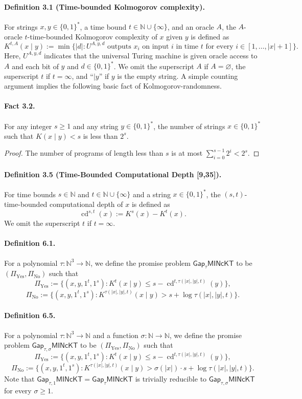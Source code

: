 \documentclass[10pt,a4paper]{article}
\begin{document}
\paragraph{Definition 3.1 (Time-bounded Kolmogorov complexity).}
For strings $x,y\in\{0,1\}^*$, a time bound $t\in\mathbb N\cup\{\infty\}$, and an oracle $A$, the $A$-oracle $t$-time-bounded Kolmogorov complexity of $x$ given $y$ is defined as
\[K^{t,A}(x\mid y):=\min\{|d|:U^{A,y,d}\text{ outputs }x_i\text{ on input }i\text{ in time }t\text{ for every }i\in[1,\ldots,|x|+1]\}.\]
Here, $U^{A,y,d}$ indicates that the universal Turing machine is given oracle access to $A$ and each bit of $y$ and $d\in\{0,1\}^*$. We omit the superscript $A$ if $A=\varnothing$, the superscript $t$ if $t=\infty$, and ``$\mid y$'' if $y$ is the empty string.
A simple counting argument implies the following basic fact of Kolmogorov-randomness.
\paragraph{Fact 3.2.}
For any integer $s\geq1$ and any string $y\in\{0,1\}^*$, the number of strings $x\in\{0,1\}^*$ such that $K(x\mid y)<s$ is less than $2^s$.
\begin{proof}
The number of programs of length less than $s$ is at most $\sum_{i=0}^{s-1}2^i<2^s$.
\end{proof}

\paragraph{Definition 3.5 (Time-Bounded Computational Depth [9,35]).}
For time bounds $s\in\mathbb N$ and $t\in\mathbb N\cup\{\infty\}$ and a string $x\in\{0,1\}^*$, the $(s,t)$-time-bounded computational depth of $x$ is defined as
\[\operatorname{cd}^{s,t}(x):=K^s(x)-K^t(x).\]
We omit the superscript $t$ if $t=\infty$.
\paragraph{Definition 6.1.}
For a polynomial $\tau:\mathbb N^3\to\mathbb N$, we define the promise problem $\mathsf{Gap}_{\tau}\mathsf{MINcKT}$ to be $(\Pi_{\mathrm{Yes}},\Pi_{\mathrm{No}})$ such that
\[\Pi_{\mathrm{Yes}}:=\{(x,y,1^t,1^s):K^t(x\mid y)\leq s-\operatorname{cd}^{t,\tau(|x|,|y|,t)}(y)\},\]
\[\Pi_{\mathrm{No}}:=\{(x,y,1^t,1^s):K^{\tau(|x|,|y|,t)}(x\mid y)>s+\log\tau(|x|,|y|,t)\}.\]
\paragraph{Definition 6.5.}
For a polynomial $\tau:\mathbb N^3\to\mathbb N$ and a function $\sigma:\mathbb N\to\mathbb N$, we define the promise problem $\mathsf{Gap}_{\tau,\sigma}\mathsf{MINcKT}$ to be $(\Pi_{\mathrm{Yes}},\Pi_{\mathrm{No}})$ such that
\[\Pi_{\mathrm{Yes}}:=\{(x,y,1^t,1^s):K^t(x\mid y)\leq s-\operatorname{cd}^{t,\tau(|x|,|y|,t)}(y)\},\]
\[\Pi_{\mathrm{No}}:=\{(x,y,1^t,1^s):K^{\tau(|x|,|y|,t)}(x\mid y)>\sigma(|x|)\cdot s+\log\tau(|x|,|y|,t)\}.\]
Note that $\mathsf{Gap}_{\tau,1}\mathsf{MINcKT}=\mathsf{Gap}_{\tau}\mathsf{MINcKT}$ is trivially reducible to $\mathsf{Gap}_{\tau,\sigma}\mathsf{MINcKT}$ for every $\sigma\geq1$.
\end{document}
